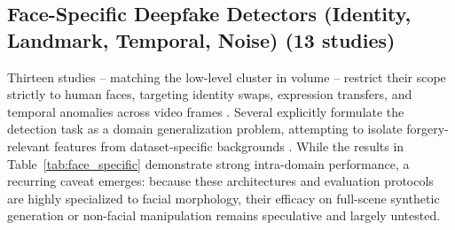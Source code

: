 \documentclass[sn-mathphys-num,Numbered,pdflatex]{sn-jnl}
\begin{document}
\subsection{Face-Specific Deepfake Detectors (Identity, Landmark, Temporal, Noise) (13 studies)}
Thirteen studies -- matching the low-level cluster in volume -- restrict their scope strictly to human faces, targeting identity swaps, expression transfers, and temporal anomalies across video frames \cite{ContrastivePseudo1,DynamicSpatialtemporal50,TowardsGeneralizable49}. Several explicitly formulate the detection task as a domain generalization problem, attempting to isolate forgery-relevant features from dataset-specific backgrounds \cite{CrossdfImproving44,GmdfGeneralized37}. While the results in Table~\ref{tab:face_specific} demonstrate strong intra-domain performance, a recurring caveat emerges: because these architectures and evaluation protocols are highly specialized to facial morphology, their efficacy on full-scene synthetic generation or non-facial manipulation remains speculative and largely untested.
\end{document}
